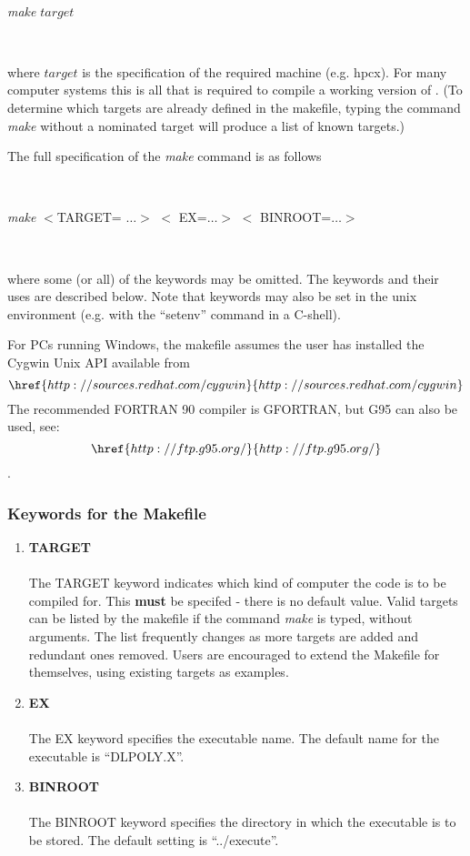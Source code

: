 ~

{\em make} $target$

~ 

\noindent where $target$ is the specification of the required machine
(e.g. hpcx). For many computer systems this is all that is required
to compile a working version of \D{}. (To determine which targets are
already defined in the makefile, typing the command {\em make} without
a nominated target will produce a list of known targets.)

The full specification of the {\em make} command is as follows

~

{\em make} $<$TARGET= $\ldots >$ 
$<$ EX=$\ldots >$ $<$ BINROOT=$\ldots >$ 

~

\noindent where some (or all) of the keywords may be omitted. 
The keywords and their uses are described below.  Note that keywords
may also be set in the unix environment (e.g. with the ``setenv''
command in a C-shell).

For PCs running Windows, \label{PC compile} the makefile assumes the
user has installed the Cygwin Unix API available from
\[\href{http://sources.redhat.com/cygwin}{http://sources.redhat.com/cygwin}\]
The recommended FORTRAN 90 compiler is GFORTRAN, but G95 can also be used,
see: 
\[\href{http://ftp.g95.org/}{http://ftp.g95.org/}\].

\subsubsection{Keywords for the Makefile}

\begin{enumerate}
\item {\bf TARGET}\\~\\
The TARGET keyword indicates which kind of computer the code is
to be compiled for. This {\bf must} be specifed - there is no default value.
Valid targets can be listed by the makefile if the command {\em make}
is typed, without arguments. The list frequently changes as more
targets are added and redundant ones removed. Users are encouraged to
extend the Makefile for themselves, using existing targets as examples.
\item {\bf EX}\\~\\
The EX keyword specifies the executable name. The default name for the
executable is ``DLPOLY.X''.
\item {\bf BINROOT}\\~\\
The BINROOT keyword specifies the directory in which the executable is
to be stored.  The default setting is ``../execute''.
\end{enumerate}

